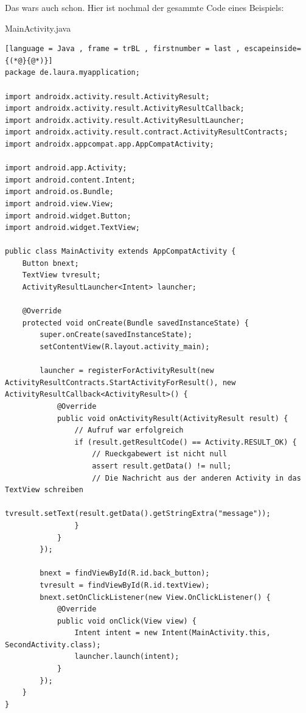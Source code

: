 \documentclass[8pt, letterpaper]{article}
\begin{document}
Das wars auch schon. Hier ist nochmal der gesammte Code eines Beispiels:
\pagebreak

MainActivity.java
\begin{lstlisting}[language = Java , frame = trBL , firstnumber = last , escapeinside={(*@}{@*)}]
package de.laura.myapplication;

import androidx.activity.result.ActivityResult;
import androidx.activity.result.ActivityResultCallback;
import androidx.activity.result.ActivityResultLauncher;
import androidx.activity.result.contract.ActivityResultContracts;
import androidx.appcompat.app.AppCompatActivity;

import android.app.Activity;
import android.content.Intent;
import android.os.Bundle;
import android.view.View;
import android.widget.Button;
import android.widget.TextView;

public class MainActivity extends AppCompatActivity {
    Button bnext;
    TextView tvresult;
    ActivityResultLauncher<Intent> launcher;

    @Override
    protected void onCreate(Bundle savedInstanceState) {
        super.onCreate(savedInstanceState);
        setContentView(R.layout.activity_main);

        launcher = registerForActivityResult(new ActivityResultContracts.StartActivityForResult(), new ActivityResultCallback<ActivityResult>() {
            @Override
            public void onActivityResult(ActivityResult result) {
                // Aufruf war erfolgreich
                if (result.getResultCode() == Activity.RESULT_OK) {
                    // Rueckgabewert ist nicht null
                    assert result.getData() != null;
                    // Die Nachricht aus der anderen Activity in das TextView schreiben
                    tvresult.setText(result.getData().getStringExtra("message"));
                }
            }
        });

        bnext = findViewById(R.id.back_button);
        tvresult = findViewById(R.id.textView);
        bnext.setOnClickListener(new View.OnClickListener() {
            @Override
            public void onClick(View view) {
                Intent intent = new Intent(MainActivity.this, SecondActivity.class);
                launcher.launch(intent);
            }
        });
    }
}
\end{lstlisting}

% 
\end{document}
